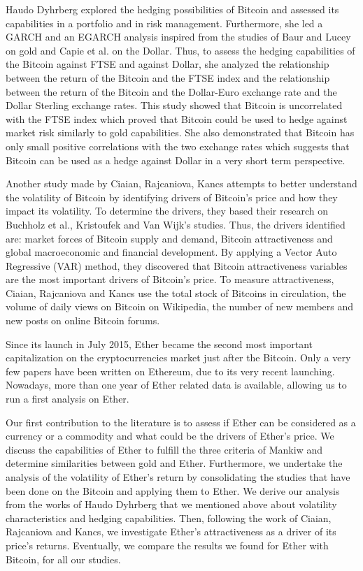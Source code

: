 \documentclass[11pt]{report}
\begin{document}
Haudo Dyhrberg explored the hedging possibilities of Bitcoin and assessed its capabilities in a portfolio and in risk management. Furthermore, she led a GARCH and an EGARCH analysis inspired from the studies of Baur and Lucey \cite{BAUR} on gold and Capie et al.\cite{CAPPIE} on the Dollar. Thus, to assess the hedging capabilities of the Bitcoin against FTSE and against Dollar, she analyzed the relationship between the return of the Bitcoin and the FTSE index and the relationship between the return of the Bitcoin and the Dollar-Euro exchange rate and the Dollar Sterling exchange rates.  This study showed that Bitcoin is uncorrelated with the FTSE index which proved that Bitcoin could be used to hedge against market risk similarly to gold capabilities. She also demonstrated that Bitcoin has only small positive correlations with the two exchange rates which suggests that Bitcoin can be used as a hedge against Dollar in a very short term perspective.\newline

Another study made by Ciaian, Rajcaniova, Kancs \cite{CIAIAN} attempts to better understand the volatility of Bitcoin by identifying drivers of Bitcoin’s price and how they impact its volatility. To determine the drivers, they based their research on Buchholz et al.\cite{BUCHHOLZ}, Kristoufek\cite{KRISTOUFEK} and Van Wijk’s \cite{WIJK} studies. Thus, the drivers identified are: market forces of Bitcoin supply and demand, Bitcoin attractiveness and global macroeconomic and financial development. By applying a Vector Auto Regressive (VAR) method, they discovered that Bitcoin attractiveness variables are the most important drivers of Bitcoin’s price. To measure attractiveness, Ciaian, Rajcaniova and Kancs use the total stock of Bitcoins in circulation, the volume of daily views on Bitcoin on Wikipedia, the number of new members and new posts on online Bitcoin forums.\newline

Since its launch in July 2015, Ether became the second most important capitalization on the cryptocurrencies market just after the Bitcoin. Only a very few papers have been written on Ethereum, due to its very recent launching. Nowadays, more than one year of Ether related data is available, allowing us to run a first analysis on Ether.\clearpage

Our first contribution to the literature is to assess if Ether can be considered as a currency or a commodity and what could be the drivers of Ether’s price. We discuss the capabilities of Ether to fulfill the three criteria of Mankiw and determine similarities between gold and Ether. Furthermore, we undertake the analysis of the volatility of Ether’s return by consolidating the studies that have been done on the Bitcoin and applying them to Ether. We derive our analysis from the works of Haudo Dyhrberg that we mentioned above about volatility characteristics and hedging capabilities. Then, following the work of Ciaian, Rajcaniova and Kancs, we investigate Ether’s attractiveness as a driver of its price’s returns. Eventually, we compare the results we found for Ether with Bitcoin, for all our studies.
\end{document}

